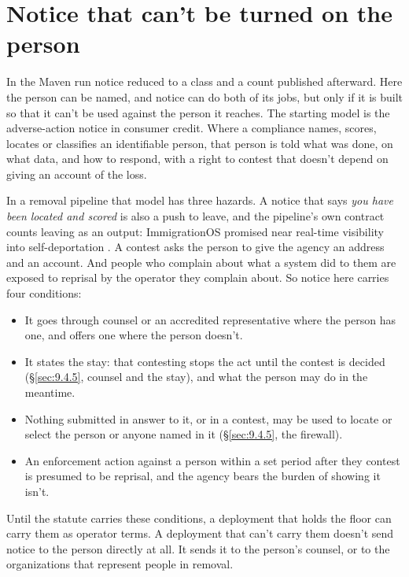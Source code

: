 \section{Notice that can't be turned on the person}
\label{sec:9.6}
In the Maven run notice reduced to a class and a count published afterward. Here the person can be named, and notice can do both of its jobs, but only if it is built so that it can't be used against the person it reaches. The starting model is the adverse-action notice in consumer credit. Where a compliance names, scores, locates or classifies an identifiable person, that person is told what was done, on what data, and how to respond, with a right to contest that doesn't depend on giving an account of the loss.

In a removal pipeline that model has three hazards. A notice that says \emph{you have been located and scored} is also a push to leave, and the pipeline's own contract counts leaving as an output: ImmigrationOS promised near real-time visibility into self-deportation \autocite{Ho2025ImmigrationOS}. A contest asks the person to give the agency an address and an account. And people who complain about what a system did to them are exposed to reprisal by the operator they complain about. So notice here carries four conditions:

\begin{itemize}
\item It goes through counsel or an accredited representative where the person has one, and offers one where the person doesn't.
\item It states the stay: that contesting stops the act until the contest is decided (\S\ref{sec:9.4.5}, counsel and the stay), and what the person may do in the meantime.
\item Nothing submitted in answer to it, or in a contest, may be used to locate or select the person or anyone named in it (\S\ref{sec:9.4.5}, the firewall).
\item An enforcement action against a person within a set period after they contest is presumed to be reprisal, and the agency bears the burden of showing it isn't.
\end{itemize}

Until the statute carries these conditions, a deployment that holds the floor can carry them as operator terms. A deployment that can't carry them doesn't send notice to the person directly at all. It sends it to the person's counsel, or to the organizations that represent people in removal.

